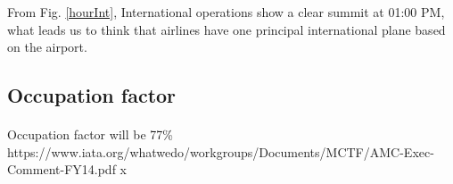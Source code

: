 From Fig. \ref{hourInt}, International operations show a clear summit at 01:00 PM, what leads us to think that airlines have one principal international plane based on the airport.
	\subsection{Occupation factor}
	\paragraph{} Occupation factor will be 77\%
	https://www.iata.org/whatwedo/workgroups/Documents/MCTF/AMC-Exec-Comment-FY14.pdf
	\cite{IATA_PLF}x
	
	